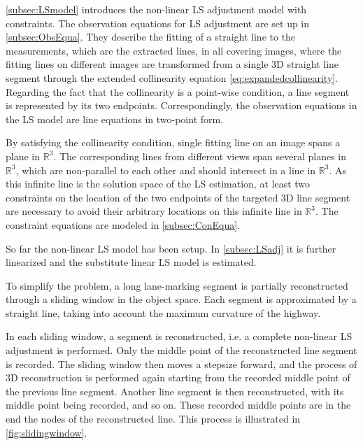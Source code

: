 \cref{subsec:LSmodel} introduces the non-linear LS adjustment model with constraints. The observation equations for LS adjustment are set up in \cref{subsec:ObsEqua}. They describe the fitting of a straight line to the measurements, which are the extracted lines, in all covering images, where the fitting lines on different images are transformed from a single 3D straight line segment through the extended collinearity equation \eqref{eq:expandedcollinearity}. Regarding the fact that the collinearity is a point-wise condition, a line segment is represented by its two endpoints. Correspondingly, the observation equations in the LS model are line equations in two-point form. 

By satisfying the collinearity condition, single fitting line on an image spans a plane in $\mathbb{R}^3$. The corresponding lines from different views span several planes in $\mathbb{R}^3$, which are non-parallel to each other and should intersect in a line in $\mathbb{R}^3$. As this infinite line is the solution space of the LS estimation, at least two constraints on the location of the two endpoints of the targeted 3D line segment are necessary to avoid their arbitrary locations on this infinite line in $\mathbb{R}^3$. The constraint equations are modeled in \cref{subsec:ConEqua}.

So far the non-linear LS model has been setup. In \cref{subsec:LSadj} it is further linearized and the substitute linear LS model is estimated.


To simplify the problem, a long lane-marking segment is partially reconstructed through a sliding window in the object space. Each segment is approximated by a straight line, taking into account the maximum curvature of the highway. 

In each sliding window, a segment is reconstructed, i.e. a complete non-linear LS adjustment is performed. Only the middle point of the reconstructed line segment is recorded. The sliding window then moves a stepsize forward, and the process of 3D reconstruction is performed again starting from the recorded middle point of the previous line segment. Another line segment is then reconstructed, with its middle point being recorded, and so on. These recorded middle points are in the end the nodes of the reconstructed line. This process is illustrated in \cref{fig:slidingwindow}.


